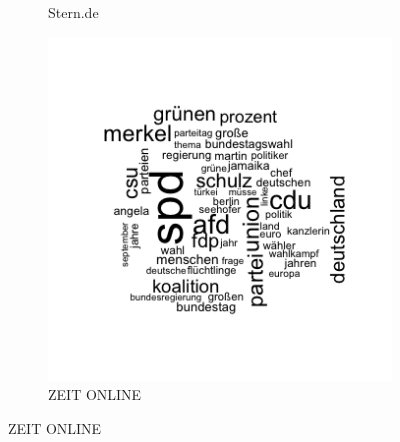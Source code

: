 \documentclass[12pt,a4paper,notitlepage]{article}
\begin{document}
\begin{figure}[H]
\begin{center}
\begin{subfigure}[normla]{0.43\textwidth}
			\caption{Stern.de}
		\end{subfigure}
		\begin{subfigure}[normla]{0.43\textwidth}
			\includegraphics[width=\textwidth]{figs/wordcloud_ZEITONLINE.png}
			\caption{ZEIT ONLINE}
		\end{subfigure}
	\end{center}
\end{figure}
\end{document}

